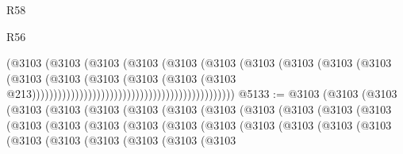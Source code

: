 \begin{lexlean}{R58}
\begin{lexlean}{R56}
\begin{coremodule}
{{{{{{{{{{{{{{{{{{{{{{{{{{{{{{{{{{{{{{{{{{{{{{{{{{{{{{{{{{{{{{{{{{{{{{{{{{{{{{{{{{{{{{{{{{{{{{{{{{{{{{{{{{{{{{{{{{{{{{{{{{{{{{{{{{{{{{{{{{{{{{{{{{{{{{{{{{{{{{{{{{{{{{{{{{{{{{{{{{{{{{{{{{{{{{{{{{{{{{{{{{{{{{{{{{{                                                                  (@3103
                                                                    (@3103
                                                                      (@3103
                                                                        (@3103
                                                                          (@3103
                                                                            (@3103
                                                                              (@3103
                                                                                (@3103
                                                                                  (@3103
                                                                                    (@3103
                                                                                      (@3103
                                                                                        (@3103
                                                                                          (@3103
                                                                                            (@3103
                                                                                              (@3103
                                                                                                (@3103
                                                                                                  @213)))))))))))))))))))))))))))))))))))))))))))))))
@5133 := @3103
    (@3103
      (@3103
        (@3103
          (@3103
            (@3103
              (@3103
                (@3103
                  (@3103
                    (@3103
                      (@3103
                        (@3103
                          (@3103
                            (@3103
                              (@3103
                                (@3103
                                  (@3103
                                    (@3103
                                      (@3103
                                        (@3103
                                          (@3103
                                            (@3103
                                              (@3103
                                                (@3103
                                                  (@3103
                                                    (@3103
                                                      (@3103
                                                        (@3103
                                                          (@3103
}}}}}}}}}}}}}}}}}}}}}}}}}}}}}}}}}}}}}}}}}}}}}}}}}}}}}}}}}}}}}}}}}}}}}}}}}}}}}}}}}}}}}}}}}}}}}}}}}}}}}}}}}}}}}}}}}}}}}}}}}}}}}}}}}}}}}}}}}}}}}}}}}}}}}}}}}}}}}}}}}}}}}}}}}}}}}}}}}}}}}}}}}}}}}}}}}}}}}}}}}}}}}}}}}}}
\end{coremodule}
\end{lexlean}
\end{lexlean}
